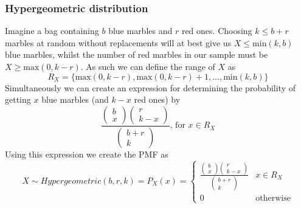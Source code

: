 \subsubsection{Hypergeometric distribution}
Imagine a bag containing $b$ blue marbles and $r$ red ones. Choosing $k\leq b+r$ marbles at random without replacements will at best give us $X\leq \text{min}(k,b)$ blue marbles, whilst the number of red marbles in our sample must be $X\geq \text{max}(0,k-r)$. As such we can define the range of $X$ as
\[
    R_X=\{\text{max}(0,k-r),\text{max}(0,k-r)+1,\ldots,\text{min}(k,b)\}
\]
Simultaneously we can create an expression for determining the probability of getting $x$ blue marbles (and $k-x$ red ones) by
\[
    \frac{\begin{pmatrix}b\\x\end{pmatrix}\begin{pmatrix}r\\k-x\end{pmatrix}}{\begin{pmatrix}b+r\\k\end{pmatrix}} \text{, for } x\in R_X
\]
Using this expression we create the PMF as
\[
    X\sim Hypergeometric(b,r,k)=P_{X}(x)=\begin{cases}\frac{\begin{pmatrix}b\\x\end{pmatrix}\begin{pmatrix}r\\k-x\end{pmatrix}}{\begin{pmatrix}b+r\\k\end{pmatrix}} & x\in R_X \\ 0 & \text{otherwise}\end{cases}
\]
